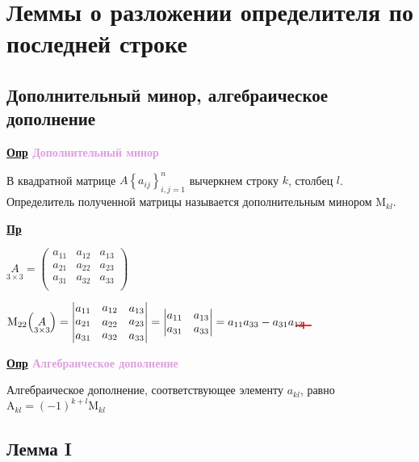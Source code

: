 \documentclass[12pt, a4paper]{report}
\newcommand{\tikzmarkempty}[2]{\tikz[overlay,remember picture,baseline=-2pt] \node [anchor=center, inner sep=0] (#1) {$#2$};}
\newcommand{\df}[1][]{\begin{flushleft}\textbf{\underline{Опр} \textcolor{Plum}{#1}}\end{flushleft}}
\newcommand{\ex}{\begin{flushleft}\textbf{\underline{Пр}}\end{flushleft}}
\begin{document}
	\section{Леммы о разложении определителя по последней строке}
	\subsection{Дополнительный минор, алгебраическое дополнение}
	\df[Дополнительный минор]\label{2.5.1}
	
	В квадратной матрице $A\left\{a_{ij}\right\}_{i,j=1}^{n}$ вычеркнем строку $k$, столбец $l$. Определитель полученной матрицы называется дополнительным минором $\mathrm{M}_{kl}$.
	
	\ex
	
	$\displaystyle 
	\underset{3\times 3}{A}=\begin{pmatrix}
		a_{11}&a_{12}&a_{13}\\
		a_{21}&a_{22}&a_{23}\\
		a_{31}&a_{32}&a_{33}\\
	\end{pmatrix}
	$
	\bigskip
	
	$\mathrm{M}_{22}\Big(\underset{3\times 3}{A}\Big)=
	\begin{vmatrix}
		a_{11}&\tikzmarkempty{A}{a_{12}}&a_{13}\\
		\tikzmarkempty{C}{a_{21}}&a_{22}&\tikzmarkempty{D}{a_{23}}\\
		a_{31}&\tikzmarkempty{B}{a_{32}}&a_{33}\\
	\end{vmatrix}=
	\begin{vmatrix}
		a_{11}&a_{13}\\
		a_{31}&a_{33}\\
	\end{vmatrix}=a_{11}a_{33}-a_{31}a_{13}
	\begin{tikzpicture}[overlay, remember picture]
		\draw[red, very thick] (A.north) to (B.south);
		\draw[red, very thick] (C.west) to (D.east);
	\end{tikzpicture}
	$
	
	\df[Алгебраическое дополнение]
	
	Алгебраическое дополнение, соответствующее элементу $a_{kl}$, равно $\mathrm{A}_{kl}=(-1)^{k+l}\mathrm{M}_{kl}$
	\subsection{Лемма I}\label{2.5.2}
	
\end{document}
